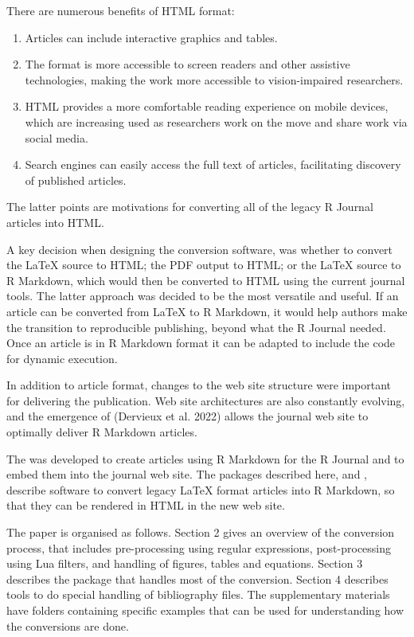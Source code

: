 There are numerous benefits of HTML format:

\begin{enumerate}
\def\labelenumi{\arabic{enumi}.}
\tightlist
\item
  Articles can include interactive graphics and tables.
\item
  The format is more accessible to screen readers and other assistive technologies, making the work more accessible to vision-impaired researchers.
\item
  HTML provides a more comfortable reading experience on mobile devices, which are increasing used as researchers work on the move and share work via social media.
\item
  Search engines can easily access the full text of articles, facilitating discovery of published articles.
\end{enumerate}

The latter points are motivations for converting all of the legacy R Journal articles into HTML.

A key decision when designing the conversion software, was whether to convert the LaTeX source to HTML; the PDF output to HTML; or the LaTeX source to R Markdown, which would then be converted to HTML using the current journal tools. The latter approach was decided to be the most versatile and useful. If an article can be converted from LaTeX to R Markdown, it would help authors make the transition to reproducible publishing, beyond what the R Journal needed. Once an article is in R Markdown format it can be adapted to include the code for dynamic execution.

In addition to article format, changes to the web site structure were important for delivering the publication. Web site architectures are also constantly evolving, and the emergence of  (Dervieux et al. 2022) allows the journal web site to optimally deliver R Markdown articles.

The  was developed to create articles using R Markdown for the R Journal and to embed them into the journal web site. The packages described here,  and , describe software to convert legacy LaTeX format articles into R Markdown, so that they can be rendered in HTML in the new web site.

The paper is organised as follows. Section 2 gives an overview of the conversion process, that includes pre-processing using regular expressions, post-processing using Lua filters, and handling of figures, tables and equations. Section 3 describes the  package that handles most of the conversion. Section 4 describes tools to do special handling of bibliography files. The supplementary materials have folders containing specific examples that can be used for understanding how the conversions are done.

